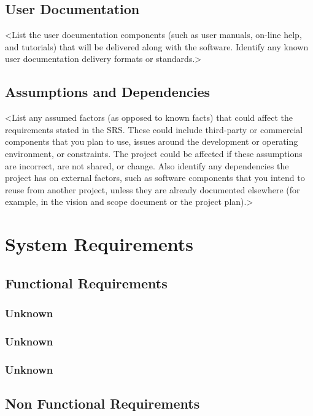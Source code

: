 \section{User Documentation}

<List the user documentation components (such as user manuals, on-line help, and tutorials) that will be delivered along with the software. Identify any known user documentation delivery formats or standards.>

\section{Assumptions and Dependencies}

<List any assumed factors (as opposed to known facts) that could affect the requirements stated in the SRS. These could include third-party or commercial components that you plan to use, issues around the development or operating environment, or constraints. The project could be affected if these assumptions are incorrect, are not shared, or change. Also identify any dependencies the project has on external factors, such as software components that you intend to reuse from another project, unless they are already documented elsewhere (for example, in the vision and scope document or the project plan).>

\newpage

\chapter{System Requirements}
\label{ch:sys-req}


\section{Functional Requirements}
\subsection{Unknown}
\subsection{Unknown}
\subsection{Unknown}
\section{Non Functional Requirements}

